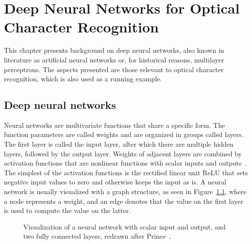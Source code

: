 \documentclass[english,twoside,openright]{UH_DS_MSc}
\begin{document}
\chapter{Deep Neural Networks for Optical Character Recognition}

This chapter presents background on deep neural networks, also known 
in literature as artificial neural networks or, for historical reasons, multilayer perceptrons.
The aspects presented are those relevant to optical character recognition,
which is also used as a running example.

\section{Deep neural networks}

Neural networks are multivariate functions that share a specific form.
The function parameters are called weights and are organized in groups called layers.
The first layer is called the input layer, after which there are multiple hidden layers, followed by the output layer.
Weights of adjacent layers are combined by activation functions that are nonlinear functions with 
scalar inputs and outputs~\cite{princebook}. The simplest of the activation functions is the rectified
linear unit ReLU that sets negative input values to zero and otherwise keeps the input as is. A neural network is usually visualized with a graph structure, as seen in Figure~\ref{image:neuralnet}, where a node represents a 
weight, and an edge denotes that the value on the first layer is used to compute the value on the latter.

\begin{figure}[ht]
    \centering
\caption{Visualization of a neural network with scalar input and output, and two fully connected layers, redrawn after Prince~\cite{princebook}.}
\label{image:neuralnet}
\end{figure}
\end{document}
